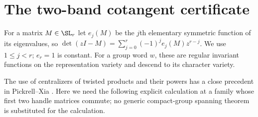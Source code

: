 \section{The two-band cotangent certificate}\label{sec:tangents}
For a matrix $M\in\SL_r$ let $e_j(M)$ be the $j$th elementary symmetric
function of its eigenvalues, so
$\det(zI-M)=\sum_{j=0}^r(-1)^je_j(M)z^{r-j}$. We use $1\leq j<r$;
$e_r=1$ is constant. For a group word $w$, these are regular invariant
functions on the representation variety and descend to its character
variety.

The use of centralizers of twisted products and their powers has a close
precedent in Pickrell--Xia \cite[Proposition 2.1.24, Lemma 2.1.34]{PX}.
Here we need the following explicit calculation at a family whose first
two handle matrices commute; no generic compact-group spanning theorem
is substituted for the calculation.

